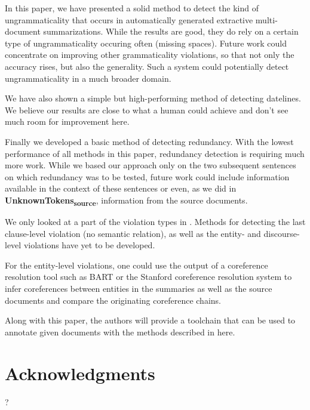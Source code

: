 \documentclass[a4paper,10pt]{scrartcl}
\theoremstyle{style}
\begin{document}
In this paper, we have presented a solid method to detect the kind of ungrammaticality that occurs in automatically generated extractive multi-document summarizations. While the results are good, they do rely on a certain type of ungrammaticality occuring often (missing spaces). Future work could concentrate on improving other grammaticality violations, so that not only the accuracy rises, but also the generality. Such a system could potentially detect ungrammaticality in a much broader domain.

We have also shown a simple but high-performing method of detecting datelines. We believe our results are close to what a human could achieve and don't see much room for improvement here.

Finally we developed a basic method of detecting redundancy. With the lowest performance of all methods in this paper, redundancy detection is requiring much more work. While we based our approach only on the two subsequent sentences on which redundancy was to be tested, future work could include information available in the context of these sentences or even, as we did in \textbf{UnknownTokens\textsubscript{source}}, information from the source documents.

We only looked at a part of the violation types in \cite{friedrichlqvsumm}. Methods for detecting the last clause-level violation (no semantic relation), as well as the entity- and discourse-level violations have yet to be developed.

For the entity-level violations, one could use the output of a coreference resolution tool such as BART \citep{versley2008bart} or the Stanford coreference resolution system \citep{lee2011stanford} to infer coreferences between entities in the summaries as well as the source documents and compare the originating coreference chains.

Along with this paper, the authors will provide a toolchain that can be used to annotate given documents with the methods described in here.

\section*{Acknowledgments}

?

\newpage


\end{document}
